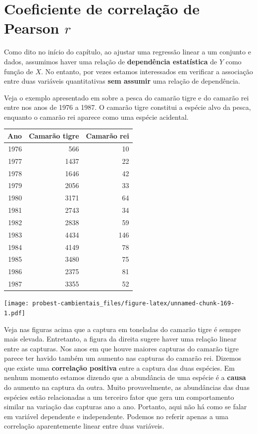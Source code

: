 \documentclass[
]{book}
\begin{document}
\hypertarget{coeficiente-de-correlauxe7uxe3o-de-pearson-r}{%
\section{\texorpdfstring{Coeficiente de correlação de Pearson \(r\)}{Coeficiente de correlação de Pearson r}}\label{coeficiente-de-correlauxe7uxe3o-de-pearson-r}}

Como dito no início do capítulo, ao ajustar uma regressão linear a um conjunto e dados, assumimos haver uma relação de \textbf{dependência estatística} de \(Y\) como função de \(X\). No entanto, por vezes estamos interessados em verificar a associação entre duas variáveis quantitativas \textbf{sem assumir} uma relação de dependência.

Veja o exemplo apresentado em \citep{haddon2010modelling} sobre a pesca do camarão tigre e do camarão rei entre nos anos de 1976 a 1987. O camarão tigre constitui a espécie alvo da pesca, enquanto o camarão rei aparece como uma espécie acidental.

\begin{tabular}{r|r|r}
\hline
Ano & Camarão tigre & Camarão rei\\
\hline
1976 & 566 & 10\\
\hline
1977 & 1437 & 22\\
\hline
1978 & 1646 & 42\\
\hline
1979 & 2056 & 33\\
\hline
1980 & 3171 & 64\\
\hline
1981 & 2743 & 34\\
\hline
1982 & 2838 & 59\\
\hline
1983 & 4434 & 146\\
\hline
1984 & 4149 & 78\\
\hline
1985 & 3480 & 75\\
\hline
1986 & 2375 & 81\\
\hline
1987 & 3355 & 52\\
\hline
\end{tabular}

\texttt{[image: probest-cambientais\_files/figure-latex/unnamed-chunk-169-1.pdf]}

Veja nas figuras acima que a captura em toneladas do camarão tigre é sempre mais elevada. Entretanto, a figura da direita sugere haver uma relação linear entre as capturas. Nos anos em que houve maiores capturas do camarão tigre parece ter havido também um aumento nas capturas do camarão rei. Dizemos que existe uma \textbf{correlação positiva} entre a captura das duas espécies. Em nenhum momento estamos dizendo que a abundância de uma espécie é a \textbf{causa} do aumento na captura da outra. Muito provavelmente, as abundâncias das duas espécies estão relacionadas a um terceiro fator que gera um comportamento similar na variação das capturas ano a ano. Portanto, aqui não há como se falar em variável dependente e independente. Podemos no referir apenas a uma correlação aparentemente linear entre duas variáveis.
\end{document}
